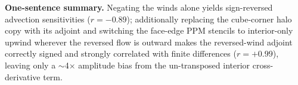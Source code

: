 \documentclass[11pt]{article}
\begin{document}
\medskip

\noindent\textbf{One-sentence summary.}
Negating the winds alone yields sign-reversed advection sensitivities
($r=-0.89$); additionally replacing the cube-corner halo copy with its adjoint
and switching the face-edge PPM stencils to interior-only upwind wherever the
reversed flow is outward makes the reversed-wind adjoint correctly signed and
strongly correlated with finite differences ($r=+0.99$), leaving only a
$\sim$4$\times$ amplitude bias from the un-transposed interior cross-derivative
term.
\end{document}
